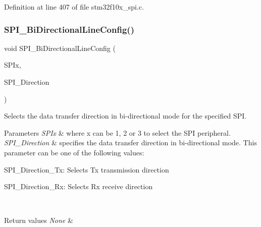 Definition at line 407 of file stm32f10x\+\_\+spi.\+c.

\mbox{\label{group___s_p_i___private___functions_ga166171c421fc51da7714723524d41b45}} 
\subsubsection{\texorpdfstring{S\+P\+I\+\_\+\+Bi\+Directional\+Line\+Config()}{SPI\_BiDirectionalLineConfig()}}
{\footnotesize\ttfamily void S\+P\+I\+\_\+\+Bi\+Directional\+Line\+Config (\begin{DoxyParamCaption}\item[{\hyperlink{struct_s_p_i___type_def}{S\+P\+I\+\_\+\+Type\+Def} $\ast$}]{S\+P\+Ix,  }\item[{uint16\+\_\+t}]{S\+P\+I\+\_\+\+Direction }\end{DoxyParamCaption})}



Selects the data transfer direction in bi-\/directional mode for the specified S\+PI. 


\begin{DoxyParams}{Parameters}
{\em S\+P\+Ix} & where x can be 1, 2 or 3 to select the S\+PI peripheral. \\
\hline
{\em S\+P\+I\+\_\+\+Direction} & specifies the data transfer direction in bi-\/directional mode. This parameter can be one of the following values\+: \begin{DoxyItemize}
\item S\+P\+I\+\_\+\+Direction\+\_\+\+Tx\+: Selects Tx transmission direction \item S\+P\+I\+\_\+\+Direction\+\_\+\+Rx\+: Selects Rx receive direction \end{DoxyItemize}
\\
\hline
\end{DoxyParams}

\begin{DoxyRetVals}{Return values}
{\em None} & \\
\hline
\end{DoxyRetVals}


